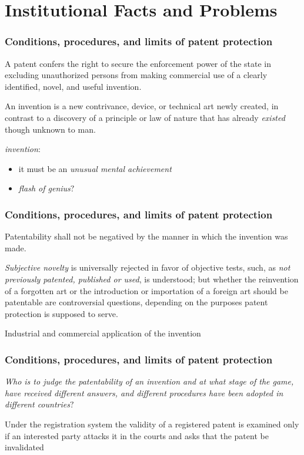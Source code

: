
\setlength{\parskip}{\baselineskip} 
\section{Institutional Facts and Problems}
\begin{frame}[t]
\frametitle{Conditions, procedures, and limits of patent protection}

A patent confers the right to secure the enforcement power of the state in excluding unauthorized persons from making commercial use of a clearly identified, novel, and useful invention.

An invention is a new contrivance, device, or technical art newly created, in contrast to a discovery of a principle or law of nature that has already \textit{existed} though unknown to man.

\textit{invention}: 
\begin{itemize}
	\item it must be an \textit{unusual mental achievement}
	\item \textit{flash of genius}$?$
\end{itemize}
\end{frame}

\begin{frame}
\frametitle{Conditions, procedures, and limits of patent protection}
Patentability shall not be negatived by the manner in which the invention was made.

\textit{Subjective novelty} is universally rejected in favor of objective tests, such, as \textit{not previously patented, published or used}, is understood; but whether the reinvention of a forgotten art or the introduction or importation of a foreign art should be patentable are controversial questions, depending on the purposes patent protection is supposed to serve.

Industrial and commercial application of the invention
\end{frame}


\begin{frame}
\frametitle{Conditions, procedures, and limits of patent protection}
\textit{Who is to judge the patentability of an invention and at what stage of the game, have received different answers, and different procedures have been adopted in different countries}$?$

Under the registration system the validity of a registered patent is examined only if an interested party attacks it in the courts and asks that the patent be invalidated
\end{frame}

